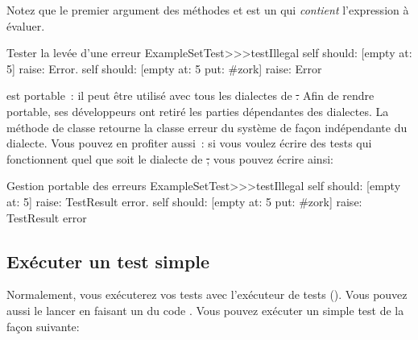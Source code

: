 \documentclass[a4paper,10pt,twoside]{book}
\begin{document}

Notez que le premier argument des méthodes  et  est 
un  qui \emph{contient}
l'expression à évaluer.
 

\begin{method}[ESTtestIllegal]{Tester la levée d'une erreur}
ExampleSetTest>>>testIllegal
	self should: [empty at: 5] raise: Error.
	self should: [empty at: 5 put: #zork] raise: Error
\end{method}

\sunit est portable~: il peut être utilisé avec tous les dialectes de \st. Afin de rendre \sunit portable, ses développeurs ont retiré les parties dépendantes des dialectes. La méthode de classe  retourne la classe erreur du système de façon indépendante du dialecte. Vous pouvez en profiter aussi~: si vous voulez écrire des tests qui fonctionnent quel que soit le dialecte de \st, vous pouvez écrire  ainsi:


\begin{method}[portabletestillegal]{Gestion portable des erreurs}
ExampleSetTest>>>testIllegal
	self should: [empty at: 5] raise: TestResult error.
	self should: [empty at: 5 put: #zork] raise: TestResult error
\end{method}


\subsection{Exécuter un test simple}
Normalement, vous exécuterez vos tests avec l'exécuteur de tests
().
Vous pouvez aussi le lancer en faisant un  du code
  . %
Vous pouvez exécuter un simple test de la façon suivante:
\end{document}

